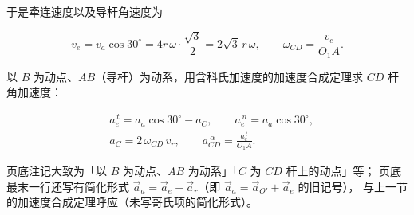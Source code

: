 \begin{longexample}
\begin{solution}
于是牵连速度以及导杆角速度为

\begin{equation}\label{eq:8-shaper-ve}
  v_e = v_a\cos 30^\circ = 4r\,\omega\cdot\frac{\sqrt{3}}{2} = 2\sqrt{3}\,r\,\omega,
  \qquad
  \omega_{CD} = \frac{v_e}{O_1A} .
\end{equation}

以 $B$ 为动点、$AB$（导杆）为动系，用含科氏加速度的加速度合成定理求 $CD$ 杆角加速度：

\begin{equation}\label{eq:8-shaper-acc}
\begin{aligned}
  &a_e^{\,t} = a_a\cos 30^\circ - a_C, \qquad
   a_e^{\,n} = a_a\cos 30^\circ,\\
  &a_C = 2\,\omega_{CD}\,v_r, \qquad
   a_{CD}^{\ \alpha} = \frac{a_e^{\,t}}{O_1A} .
\end{aligned}
\end{equation}

\begin{remark}[动点、动系选择的注记]
页底注记大致为「以 $B$ 为动点、$AB$ 为动系」「$C$ 为 $CD$ 杆上的动点」等；
页底最末一行还写有简化形式 $\vec a_a=\vec a_e+\vec a_r$（即 $\vec a_a = \vec a_{O'} + \vec a_e$ 的旧记号），
与上一节的加速度合成定理呼应（未写哥氏项的简化形式）。
\end{remark}
\end{solution}
\end{longexample}
